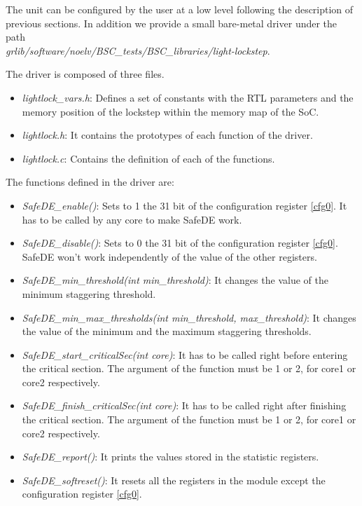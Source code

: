 The unit can be configured by the user at a low level following the description of previous sections. In addition we provide a small bare-metal driver under the path \\ \textit{grlib/software/noelv/BSC\_tests/BSC\_libraries/light-lockstep}.

The driver is composed of three files.
\begin{itemize}
\item \textit{lightlock\_vars.h}: Defines a set of constants with the RTL parameters and the memory position of the lockstep within the memory map of the SoC.
\item \textit{lightlock.h}: It contains the prototypes of each function of the driver.
\item \textit{lightlock.c}: Contains the definition of each of the functions.
\end{itemize}

The functions defined in the driver are: 
\begin{itemize}
\item \textit{SafeDE\_enable()}: Sets to 1 the 31 bit of the configuration register \ref{cfg0}. It has to be called by any core to make SafeDE work.
\item \textit{SafeDE\_disable()}: Sets to 0 the 31 bit of the configuration register \ref{cfg0}. SafeDE won't work independently of the value of the other registers. 
\item \textit{SafeDE\_min\_threshold(int min\_threshold)}: It changes the value of the minimum staggering threshold. 
\item \textit{SafeDE\_min\_max\_thresholds(int min\_threshold, max\_threshold)}: It changes the value of the minimum and the maximum staggering thresholds.
\item \textit{SafeDE\_start\_criticalSec(int core)}: It has to be called right before entering the critical section. The argument of the function must be 1 or 2, for core1 or core2 respectively.
\item \textit{SafeDE\_finish\_criticalSec(int core)}: It has to be called right after finishing the critical section. The argument of the function must be 1 or 2, for core1 or core2 respectively.
\item \textit{SafeDE\_report()}: It prints the values stored in the statistic registers.
\item \textit{SafeDE\_softreset()}: It resets all the registers in the module except the configuration register \ref{cfg0}.
\end{itemize}


\hspace{2cm}
